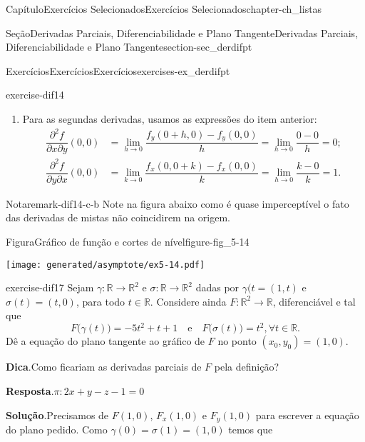 \documentclass[oneside,10pt,]{book}
\newcommand{\blocktitlefont}{\relax}
\numberwithin{equation}{section}
\newcommand{\R}{\mathbb R}
\begin{document}
\begin{chapterptx}{Capítulo}{Exercícios Selecionados}{}{Exercícios Selecionados}{}{}{chapter-ch_listas}
\begin{sectionptx}{Seção}{Derivadas Parciais, Diferenciabilidade e Plano Tangente}{}{Derivadas Parciais, Diferenciabilidade e Plano Tangente}{}{}{section-sec_derdifpt}
\begin{exercises-subsection-numberless}{Exercícios}{Exercícios}{}{Exercícios}{}{}{exercises-ex_derdifpt}
\begin{divisionexercise}{14}{}{}{exercise-dif14}
\begin{enumerate}[label=\alph*]
\begin{align*}
=\lim\limits_{h\to0}\dfrac{hy_0^3}{h(h^2+y_0^2)}=y_0\\
f_y(x_0,0)&
=\lim\limits_{k\to0}\dfrac{f(x_0,0+k)-f(x_0,0)}{k}
=\lim\limits_{k\to0}\dfrac{x_0k^3}{k(x_0^2+k^2)}=0
\end{align*}
%
\item{}Para as segundas derivadas, usamos as expressões do item anterior:%
\begin{align*}
\dfrac{\partial^2 f}{\partial x\partial
y}(0,0)&=\lim\limits_{h\to
0}\dfrac{f_y(0+h,0)-f_y(0,0)}{h}=\lim\limits_{h\to
0}\dfrac{0-0}{h}=0;\\
\dfrac{\partial^2 f}{\partial y\partial
x}(0,0)&=\lim\limits_{k\to
0}\dfrac{f_x(0,0+k)-f_x(0,0)}{k}=\lim\limits_{h\to
0}\dfrac{k-0}{k}=1.
\end{align*}
%
\end{enumerate}
\begin{remark}{Nota}{}{remark-dif14-c-b}%
Note na figura abaixo como é quase imperceptível o fato das derivadas de mistas não coincidirem na origem. \begin{figureptx}{Figura}{Gráfico de função e cortes de nível}{figure-fig_5-14}{}%
\begin{image}{0.25}{0.5}{0.25}{}%
\texttt{[image: generated/asymptote/ex5-14.pdf]}
\end{image}%
\tcblower
\end{figureptx}%
\end{remark}
\end{divisionexercise}%
\begin{divisionexercise}{17}{}{}{exercise-dif17}%
Sejam \(\gamma\colon\R\to\R^2\) e \(\sigma\colon\R\to\R^2\) dadas por \(\gamma(t =(1,t)\) e \(\sigma(t)=(t,0)\), para todo \(t\in\R\). Considere ainda \(F\colon\R^2\to\R\), diferenciável e tal que%
\begin{equation*}
F\big(\gamma(t)\big)=-5t^2+t+1\quad \text{e}\quad
F\big(\sigma(t)\big)=t^2, \forall t\in\R.
\end{equation*}
Dê a equação do plano tangente ao gráfico de \(F\) no ponto \((x_0,y_0)=(1,0)\).%
\par\smallskip%
\noindent\textbf{\blocktitlefont Dica}.\hypertarget{hint-dif17-b}{}\quad{}Como ficariam as derivadas parciais de \(F\) pela definição?%
\par\smallskip%
\noindent\textbf{\blocktitlefont Resposta}.\hypertarget{answer-dif17-c}{}\quad{}\(\pi\colon 2x+y-z-1=0\)%
\par\smallskip%
\noindent\textbf{\blocktitlefont Solução}.\hypertarget{solution-dif17-d}{}\quad{}Precisamos de \(F(1,0)\), \(F_x(1,0)\) e \(F_y(1,0)\) para escrever a equação do plano pedido. Como \(\gamma(0)=\sigma(1)=(1,0)\) temos que%

\end{divisionexercise}
\end{exercises-subsection-numberless}
\end{sectionptx}
\end{chapterptx}
\end{document}

